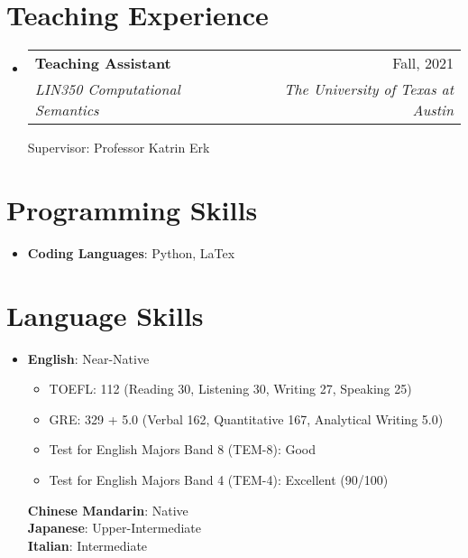 \documentclass[a4paper,11pt]{article}
\makeatletter
\newcommand{\resumeItem}[1]{
  \item\small{
    {#1 \vspace{-2pt}}
  }
}
\newcommand{\resumeSubheading}[4]{
  \vspace{-2pt}
  \item
    \begin{tabular*}{0.97\textwidth}[t]{l@{\extracolsep{\fill}}r}
      \textbf{#1} & #2 \\
      \textit{\small#3} & \textit{\small #4} \\
    \end{tabular*}
    \vspace{-7pt}
}
\newcommand{\resumeSubHeadingListStart}{\begin{itemize}[leftmargin=0.15in, label={}]}
\newcommand{\resumeSubHeadingListEnd}{\end{itemize}}
\newcommand{\resumeItemListStart}{\begin{itemize}}
\newcommand{\resumeItemListEnd}{\end{itemize}\vspace{-5pt}}
\makeatother
\begin{document}
\section{Teaching Experience}
  \resumeSubHeadingListStart
    \resumeSubheading
      {Teaching Assistant}{Fall, 2021}
      {LIN350 Computational Semantics}{The University of Texas at Austin}
      \small{Supervisor: Professor Katrin Erk}
  \resumeSubHeadingListEnd

\section{Programming Skills}
 \begin{itemize}[leftmargin=0.15in, label={}]
    \item{
     \textbf{Coding Languages}{: Python, LaTex}
     }
 \end{itemize}

\section{Language Skills}
\begin{itemize}[leftmargin=0.15in, label={}]
  \item{
   \textbf{English}{: Near-Native}\vspace{-5pt}
      \resumeItemListStart
        \resumeItem{TOEFL: 112 (Reading 30, Listening 30, Writing 27, Speaking 25)}
        \resumeItem{GRE: 329 + 5.0 (Verbal 162, Quantitative 167, Analytical Writing 5.0)}
        \resumeItem{Test for English Majors Band 8 (TEM-8): Good}
        \resumeItem{Test for English Majors Band 4 (TEM-4): Excellent (90/100)}
      \resumeItemListEnd
  \textbf{Chinese Mandarin}{: Native} \\
  \textbf{Japanese}{: Upper-Intermediate} \\
  \textbf{Italian}{: Intermediate}
   }
\end{itemize}


\end{document}
